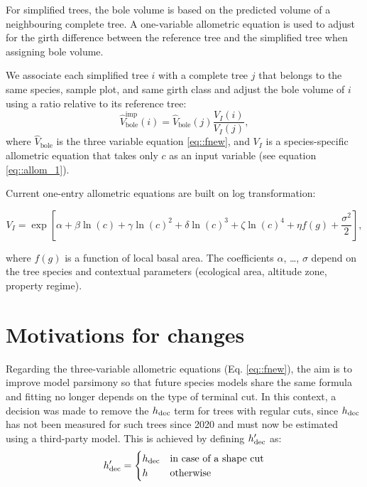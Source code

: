 For simplified trees, the bole volume is based on the predicted volume of a neighbouring complete tree. A one-variable allometric equation is used to adjust for the girth difference between the reference tree and the simplified tree when assigning bole volume.
\begin{tcolorbox}[breakable, title = Volume imputation]
We associate each simplified tree \( i \) with a complete tree \( j \) that belongs to the same species, sample plot, and same girth class and adjust the bole volume of \( i \) using a ratio relative to its reference tree:
	\begin{equation}
		\hat{V}_{\text{bole}}^{\text{imp}}(i) = \hat{V}_{\text{bole}}(j) \frac{V_{I}(i)}{V_{I}(j)},
		\label{eq::imputation}
	\end{equation}
	where \( \hat{V}_{\text{bole}} \) is the three variable equation \eqref{eq::fnew}, and \( V_{I} \) is a species-specific allometric equation that takes only \( c \) as an input variable (see equation \eqref{eq::allom_1}).
\end{tcolorbox}

Current one-entry allometric equations are built on log transformation:
\begin{fullwidth}
	\begin{equation}
		V_{I} = \exp \left[ \alpha + \beta \ln(c) + \gamma \ln(c)^2 + \delta \ln(c)^3 + \zeta \ln(c)^4 + \eta f(g) + \frac{\sigma^2}{2} \right],
		\label{eq::allom_1}
	\end{equation}
\end{fullwidth}
where \( f(g) \) is a function of local basal area. The coefficients \( \alpha \), \dots, \( \sigma \) depend on the tree species and contextual parameters (ecological area, altitude zone, property regime). 

\section{Motivations for changes}

Regarding the three-variable allometric equations (Eq. \eqref{eq::fnew}), the aim is to improve model parsimony so that future species models share the same formula and fitting no longer depends on the type of terminal cut. In this context, a decision was made to remove the \( h_{\text{dec}} \) term for trees with regular cuts, since \( h_{\text{dec}} \) has not been measured for such trees since 2020 and must now be estimated using a third-party model. This is achieved by defining \( h_{\text{dec}}' \) as:
\[
	h_{\text{dec}}' =
	\begin{cases}
		h_{\text{dec}} & \text{in case of a shape cut} \\
		h & \text{otherwise}
	\end{cases}
\]

